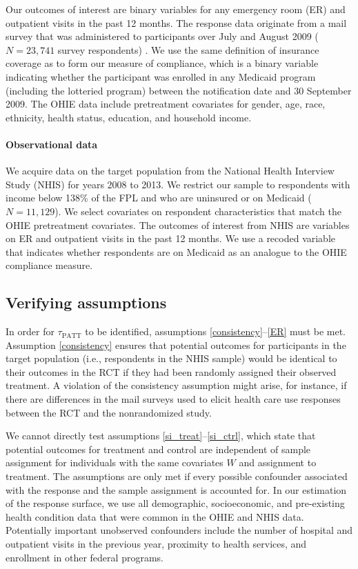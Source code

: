 \documentclass[12pt]{article}
\begin{document}
Our outcomes of interest are binary variables for any emergency room (ER) and outpatient visits in the past 12 months. The response data originate from a mail survey that was administered to participants over July and August 2009 ($N = 23,741$ survey respondents) \cite{finkelstein2012}. We use the same definition of insurance coverage as \citet{finkelstein2012} to form our measure of compliance, which is a binary variable indicating whether the participant was enrolled in any Medicaid program (including the lotteried program) between the notification date and 30 September 2009. The OHIE data include pretreatment covariates for gender, age, race, ethnicity, health status, education, and household income.

\paragraph{Observational data} 

We acquire data on the target population from the National Health Interview Study (NHIS) \cite{NHIS} for years 2008 to 2013.  We restrict our sample to respondents with income below 138\% of the FPL and who are uninsured or on Medicaid ($N=11,129$). We select covariates on respondent characteristics that match the OHIE pretreatment covariates. The outcomes of interest from NHIS are variables on ER and outpatient visits in the past 12 months. We use a recoded variable that indicates whether respondents are on Medicaid as an analogue to the OHIE compliance measure. 

\subsection{Verifying assumptions}

In order for $\tau_{\text{PATT}}$ to be identified, assumptions \eqref{consistency}--\eqref{ER} must be met.  Assumption \eqref{consistency} ensures that potential outcomes for participants in the target population (i.e., respondents in the NHIS sample) would be identical to their outcomes in the RCT if they had been randomly assigned their observed treatment. A violation of the consistency assumption might arise, for instance, if there are differences in the mail surveys used to elicit health care use responses between the RCT and the nonrandomized study. 
 
We cannot directly test assumptions \eqref{si_treat}--\eqref{si_ctrl}, which state that potential outcomes for treatment and control are independent of sample assignment for individuals with the same covariates $W$ and assignment to treatment.  The assumptions are only met if every possible confounder associated with the response and the sample assignment is accounted for.  In our estimation of the response surface, we use all demographic, socioeconomic, and pre-existing health condition data that were common in the OHIE and NHIS data.  Potentially important unobserved confounders include the number of hospital and outpatient visits in the previous year, proximity to health services, and enrollment in other federal programs. 
\end{document}

